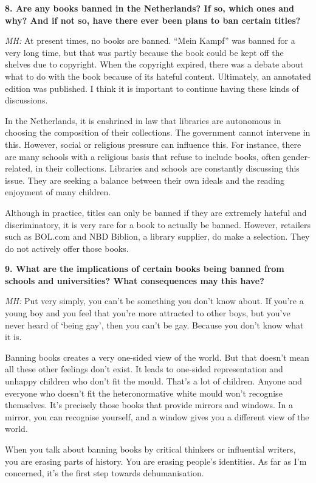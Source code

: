 \documentclass[a4paper,
fontsize=11pt,
oneside,
numbers=noperiodatend,
parskip=half-,
bibliography=totoc,
final
]{scrartcl}
\begin{document}
\textbf{8. Are any books banned in the Netherlands? If so, which ones
and why? And if not so, have there ever been plans to ban certain
titles?}

\emph{MH:} At present times, no books are banned. \enquote{Mein Kampf}
was banned for a very long time, but that was partly because the book
could be kept off the shelves due to copyright. When the copyright
expired, there was a debate about what to do with the book because of
its hateful content. Ultimately, an annotated edition was published. I
think it is important to continue having these kinds of discussions.

In the Netherlands, it is enshrined in law that libraries are autonomous
in choosing the composition of their collections. The government cannot
intervene in this. However, social or religious pressure can influence
this. For instance, there are many schools with a religious basis that
refuse to include books, often gender-related, in their collections.
Libraries and schools are constantly discussing this issue. They are
seeking a balance between their own ideals and the reading enjoyment of
many children.

Although in practice, titles can only be banned if they are extremely
hateful and discriminatory, it is very rare for a book to actually be
banned. However, retailers such as BOL.com and NBD Biblion, a library
supplier, do make a selection. They do not actively offer those books.

\textbf{9. What are the implications of certain books being banned from
schools and universities? What consequences may this have?}

\emph{MH:} Put very simply, you can't be something you don't know about.
If you're a young boy and you feel that you're more attracted to other
boys, but you've never heard of \enquote*{being gay}, then you can't be
gay. Because you don't know what it is.

Banning books creates a very one-sided view of the world. But that
doesn't mean all these other feelings don't exist. It leads to one-sided
representation and unhappy children who don't fit the mould. That's a
lot of children. Anyone and everyone who doesn't fit the heteronormative
white mould won't recognise themselves. It's precisely those books that
provide mirrors and windows. In a mirror, you can recognise yourself,
and a window gives you a different view of the world.

When you talk about banning books by critical thinkers or influential
writers, you are erasing parts of history. You are erasing people's
identities. As far as I'm concerned, it's the first step towards
dehumanisation.
\end{document}
